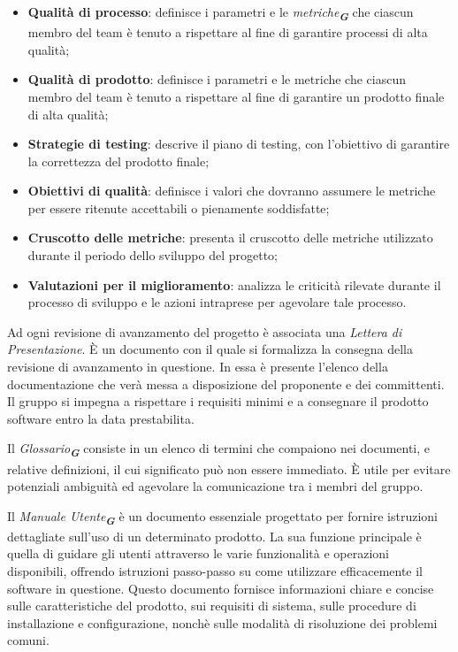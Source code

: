 \begin{enumerate}
\begin{itemize}
    \item \textbf{Qualità di processo}: definisce i parametri e le \emph{metriche}\textsubscript{\textit{\textbf{G}}} che ciascun membro del
    team è tenuto a rispettare al fine di garantire processi di alta qualità;
    \item \textbf{Qualità di prodotto}: definisce i parametri e le metriche che ciascun membro del team
    è tenuto a rispettare al fine di garantire un prodotto finale di alta qualità;
    \item \textbf{Strategie di testing}: descrive il piano di testing, con l’obiettivo di garantire la correttezza del prodotto finale;    
    \item \textbf{Obiettivi di qualità}: definisce i valori  che dovranno assumere le metriche per essere ritenute accettabili o pienamente soddisfatte;
    \item \textbf{Cruscotto delle metriche}: presenta il cruscotto delle metriche utilizzato durante il periodo dello sviluppo del progetto;
    \item \textbf{Valutazioni per il miglioramento}: analizza le criticità rilevate durante il processo di sviluppo e le azioni intraprese per agevolare tale processo.
\end{itemize}

Ad ogni revisione di avanzamento del progetto è associata una \emph{Lettera di Presentazione}.
È un documento con il quale si formalizza la consegna della revisione di avanzamento in questione. 
In essa è presente l’elenco della documentazione che verà messa a disposizione del proponente e dei committenti. 
Il gruppo si impegna a rispettare i requisiti minimi e a consegnare il prodotto software entro la data prestabilita.

Il \emph{Glossario}\textsubscript{\textit{\textbf{G}}} consiste in un elenco di termini che compaiono nei documenti, e relative definizioni, 
il cui significato può non essere immediato. È utile per evitare potenziali ambiguità ed agevolare la comunicazione tra i membri del gruppo.

Il \emph{Manuale Utente}\textsubscript{\textit{\textbf{G}}} è un documento essenziale progettato per fornire istruzioni dettagliate
sull’uso di un determinato prodotto. La sua funzione principale è quella di guidare gli utenti attraverso le varie funzionalità e operazioni disponibili, 
offrendo istruzioni passo-passo su come utilizzare efficacemente il software in questione. Questo documento fornisce informazioni chiare e concise 
sulle caratteristiche del prodotto, sui requisiti di sistema, sulle procedure di installazione e configurazione, nonchè sulle modalità 
di risoluzione dei problemi comuni.


\end{enumerate}
